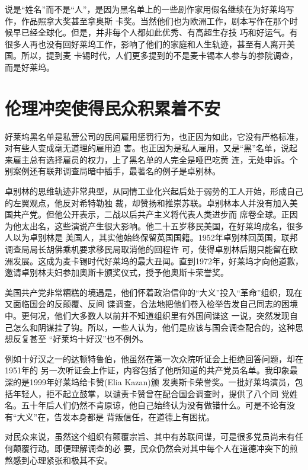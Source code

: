 \documentclass[10pt]{article}
\begin{document}
{说是``姓名''而不是``人''，是因为黑名单上的一些剧作家用假名继续在为好莱坞写作，作品照拿大奖甚至拿奥斯
卡奖。当然他们也为欧洲工作，剧本写作在那个时候早已经全球化。但是，并非每个人都如此优秀、有高超生存技
巧和好运气。有很多人再也没有回好莱坞工作，影响了他们的家庭和人生轨迹，甚至有人离开美国。所以，提到麦
卡锡时代，人们更多提到的不是麦卡锡本人参与的参院调查，而是好莱坞。

\pagebreak
\section{伦理冲突使得民众积累着不安}

好莱坞黑名单是私营公司的民间雇用惩罚行为，也正因为如此，它没有严格标准，对有些人变成毫无道理的雇用迫
害。也正因为是私人雇用，又是``黑''名单，说起来雇主总有选择雇员的权力，上了黑名单的人完全是哑巴吃黄
连，无处申诉。个别案例还有联邦调查局暗中插手，最著名的例子是卓别林。

卓别林的思维轨迹非常典型，从同情工业化兴起后处于弱势的工人开始，形成自己的左翼观点，他反对希特勒独
裁，却赞扬和推崇苏联。卓别林本人并没有加入美国共产党。但他公开表示，二战以后共产主义将代表人类进步而
席卷全球。正因为他太出名，这些演说产生很大影响。他二十五岁移民美国，在好莱坞成名，很多人以为卓别林是
美国人，其实他始终保留英国国籍。1952年卓别林回英国，联邦调查局局长胡佛乘机要求移民局取消他的回程许
可，使得卓别林后期只能留在欧洲发展。这成为麦卡锡时代好莱坞的最大丑闻。直到1972年，好莱坞才向他道歉，
邀请卓别林夫妇参加奥斯卡颁奖仪式，授予他奥斯卡荣誉奖。

美国共产党非常糟糕的境遇是，他们怀着政治信仰的``大义''投入``革命''组织，现在又面临国会的反颠覆、反间
谍调查，合法地把他们卷入检举告发自己同志的困境中。更何况，他们大多数人以前并不知道组织里有外国间谍这
一说，突然发现自己怎么和阴谋挂了钩。所以，一些人认为，他们是应该与国会调查配合的，这种思想反复甚至
``好莱坞十好汉''也不例外。

例如十好汉之一的达顿\textperiodcentered 特鲁伯，他虽然在第一次众院听证会上拒绝回答问题，却在1951年的
另一次听证会上作证，内容包括了他所知道的共产党员名单。我印象最深的是1999年好莱坞给卡赞(Elia Kazan)颁
发奥斯卡荣誉奖。一批好莱坞演员，包括年轻人，拒不起立鼓掌，以谴责卡赞曾在配合国会调查时，提供了八个同
党姓名。五十年后人们仍然不肯原谅，他自己始终认为没有做错什么。可是不论有没有``大义''在，告发本身都是
背叛信任，在道德上有困扰。

对民众来说，虽然这个组织有颠覆宗旨、其中有苏联间谍，可是很多党员尚未有任何颠覆行动。即便理解调查的必
要，民众仍然会对其中每个人在道德冲突下的煎熬感到心理紧张和极其不安。

}
\end{document}
